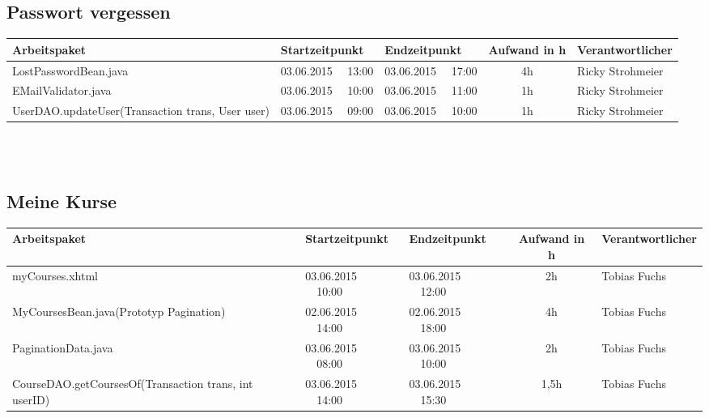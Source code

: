 \begin{landscape}
\subsection{Passwort vergessen}
\begin{tabular}{|p{10.3cm}|p{3.2cm}|p{3.2cm}|c|p{3.5cm}|}
	\hline  \textbf{Arbeitspaket} & \textbf{Startzeitpunkt} & \textbf{Endzeitpunkt} & \textbf{Aufwand in h} & \textbf{Verantwortlicher} \\ 
	\hline   LostPasswordBean.java                                & 03.06.2015 \ \ 13:00     & 03.06.2015 \ \ 17:00     &      4h             & Ricky Strohmeier\\ 
	\hline   EMailValidator.java                                  & 03.06.2015 \ \ 10:00     & 03.06.2015 \ \ 11:00     &      1h             & Ricky Strohmeier\\ 
	\hline   UserDAO.updateUser(Transaction trans, User user)     & 03.06.2015 \ \ 09:00     & 03.06.2015 \ \ 10:00     &      1h             & Ricky Strohmeier\\ 
	\hline 
\end{tabular} \ \\
\ \\

\subsection{Meine Kurse}
\begin{tabular}{|p{10.3cm}|p{3.2cm}|p{3.2cm}|c|p{3.5cm}|}
	\hline  \textbf{Arbeitspaket} & \textbf{Startzeitpunkt} & \textbf{Endzeitpunkt} & \textbf{Aufwand in h} & \textbf{Verantwortlicher} \\ 
	\hline   myCourses.xhtml                                       & 03.06.2015 \ \ 10:00       & 03.06.2015  \ \  12:00      &  2h              & Tobias Fuchs\\
	\hline   MyCoursesBean.java(Prototyp Pagination)               & 02.06.2015 \ \ 14:00       & 02.06.2015  \ \  18:00      &  4h              & Tobias Fuchs\\
	\hline   PaginationData.java                                   & 03.06.2015 \ \ 08:00       & 03.06.2015  \ \  10:00      &  2h              & Tobias Fuchs\\
	\hline   CourseDAO.getCoursesOf(Transaction trans, int userID) & 03.06.2015 \ \ 14:00       & 03.06.2015  \ \  15:30      &  1,5h            & Tobias Fuchs\\
	\hline 
\end{tabular} \ \\
\ \\


\end{landscape}
